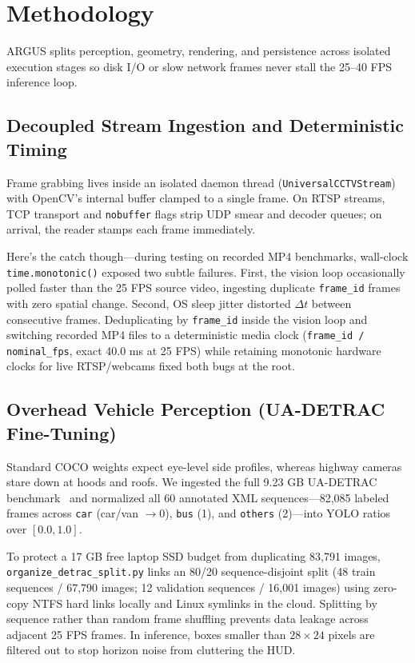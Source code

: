 \documentclass[conference]{IEEEtran}
\begin{document}
\section{Methodology}
ARGUS splits perception, geometry, rendering, and persistence across isolated execution stages so disk I/O or slow network frames never stall the 25--40 FPS inference loop.

\subsection{Decoupled Stream Ingestion and Deterministic Timing}
Frame grabbing lives inside an isolated daemon thread (\texttt{UniversalCCTVStream}) with OpenCV's internal buffer clamped to a single frame. On RTSP streams, TCP transport and \texttt{nobuffer} flags strip UDP smear and decoder queues; on arrival, the reader stamps each frame immediately.

Here's the catch though---during testing on recorded MP4 benchmarks, wall-clock \texttt{time.monotonic()} exposed two subtle failures. First, the vision loop occasionally polled faster than the 25 FPS source video, ingesting duplicate \texttt{frame\_id} frames with zero spatial change. Second, OS sleep jitter distorted $\Delta t$ between consecutive frames. Deduplicating by \texttt{frame\_id} inside the vision loop and switching recorded MP4 files to a deterministic media clock (\texttt{frame\_id / nominal\_fps}, exact 40.0 ms at 25 FPS) while retaining monotonic hardware clocks for live RTSP/webcams fixed both bugs at the root.

\subsection{Overhead Vehicle Perception (UA-DETRAC Fine-Tuning)}
Standard COCO weights expect eye-level side profiles, whereas highway cameras stare down at hoods and roofs. We ingested the full 9.23 GB UA-DETRAC benchmark~\cite{wen2020uadetrac} and normalized all 60 annotated XML sequences---82,085 labeled frames across \texttt{car} (car/van $\rightarrow 0$), \texttt{bus} (1), and \texttt{others} (2)---into YOLO ratios over $[0.0, 1.0]$.

To protect a 17 GB free laptop SSD budget from duplicating 83,791 images, \texttt{organize\_detrac\_split.py} links an 80/20 sequence-disjoint split (48 train sequences / 67,790 images; 12 validation sequences / 16,001 images) using zero-copy NTFS hard links locally and Linux symlinks in the cloud. Splitting by sequence rather than random frame shuffling prevents data leakage across adjacent 25 FPS frames. In inference, boxes smaller than $28\times 24$ pixels are filtered out to stop horizon noise from cluttering the HUD.
\end{document}

